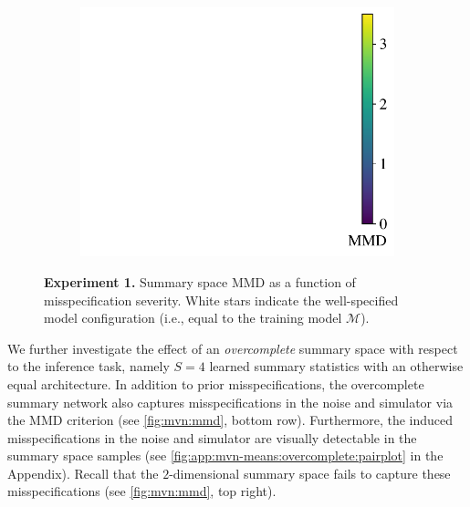 \documentclass[twoside,11pt]{article}
\newcommand{\numberGaussianMeans}{1}
\newcommand{\0}{\boldsymbol{0}}
\newcommand{\M}{\mathcal{M}}
\begin{document}
\begin{figure}[t]
\begin{subfigure}[c]{0.9\linewidth}
\begin{tabular}{ccccc}
    \end{tabular}%
    \end{subfigure}%
    \begin{subfigure}[c]{0.06\linewidth}
    \includegraphics[width=\linewidth, clip, trim=9.8cm 0cm 0.2cm 0cm]{plots/abf_mvn_means_mmd_heatmaps_colorbar.pdf}
    \end{subfigure}
    \caption{\textbf{Experiment \numberGaussianMeans.} Summary space MMD as a function of misspecification severity. White stars indicate the well-specified model configuration (i.e., equal to the training model $\M$).}
    \label{fig:mvn:mmd}
\end{figure}

We further investigate the effect of an \emph{overcomplete} summary space with respect to the inference task, namely $S=4$ learned summary statistics with an otherwise equal architecture.
In addition to prior misspecifications, the overcomplete summary network also captures misspecifications in the noise and simulator via the MMD criterion (see \autoref{fig:mvn:mmd}, bottom row).
Furthermore, the induced misspecifications in the noise and simulator are visually detectable in the summary space samples (see \autoref{fig:app:mvn-means:overcomplete:pairplot} in the Appendix).
Recall that the $2$-dimensional summary space fails to capture these misspecifications (see \autoref{fig:mvn:mmd}, top right).
    
\end{document}
